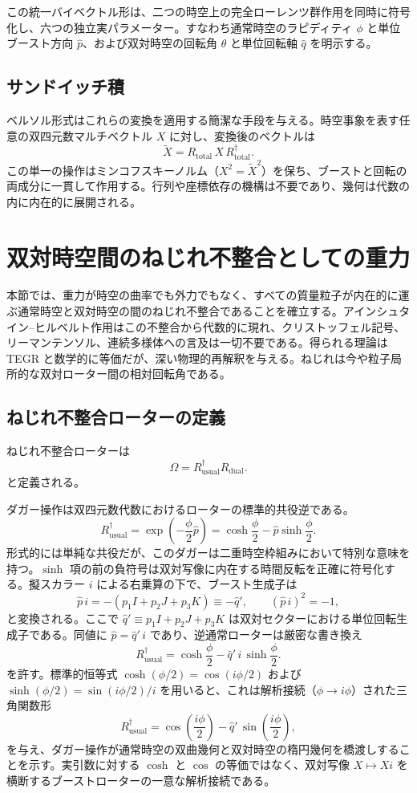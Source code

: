 \documentclass[a4paper]{article}
\begin{document}
この統一バイベクトル形は、二つの時空上の完全ローレンツ群作用を同時に符号化し、六つの独立実パラメーター。すなわち通常時空のラピディティ $\phi$ と単位ブースト方向 $\hat{p}$、および双対時空の回転角 $\theta$ と単位回転軸 $\hat{q}$ を明示する。

\subsection{サンドイッチ積}

ベルソル形式はこれらの変換を適用する簡潔な手段を与える。時空事象を表す任意の双四元数マルチベクトル $X$ に対し、変換後のベクトルは
\[
\tilde{X} = R_\text{total} \, X \, R_\text{total}^\dagger.
\]
この単一の操作はミンコフスキーノルム（$X^2 = \tilde{X}^2$）を保ち、ブーストと回転の両成分に一貫して作用する。行列や座標依存の機構は不要であり、幾何は代数の内に内在的に展開される。

\section{双対時空間のねじれ不整合としての重力}
\label{sec:gravity}

本節では、重力が時空の曲率でも外力でもなく、すべての質量粒子が内在的に運ぶ通常時空と双対時空の間のねじれ不整合であることを確立する。アインシュタイン--ヒルベルト作用はこの不整合から代数的に現れ、クリストッフェル記号、リーマンテンソル、連続多様体への言及は一切不要である。得られる理論は TEGR と数学的に等価だが、深い物理的再解釈を与える。ねじれは今や粒子局所的な双対ローター間の相対回転角である。

\subsection{ねじれ不整合ローターの定義}

ねじれ不整合ローターは
\[
\Omega = R_\text{usual}^\dagger R_\text{dual}.
\]
と定義される。

ダガー操作は双四元数代数におけるローターの標準的共役逆である。
\[
R_\text{usual}^\dagger = \exp\!\left( -\frac{\phi}{2} \hat{p} \right)
= \cosh\frac{\phi}{2} - \hat{p} \sinh\frac{\phi}{2}.
\]
形式的には単純な共役だが、このダガーは二重時空枠組みにおいて特別な意味を持つ。$\sinh$ 項の前の負符号は双対写像に内在する時間反転を正確に符号化する。擬スカラー $i$ による右乗算の下で、ブースト生成子は
\[
\hat{p}\, i = - (p_1 I + p_2 J + p_3 K) \equiv -\hat{q}',
\qquad (\hat{p}\, i)^2 = -1,
\]
と変換される。ここで $\hat{q}' \equiv p_1 I + p_2 J + p_3 K$ は双対セクターにおける単位回転生成子である。同値に $\hat{p} = \hat{q}'\, i$ であり、逆通常ローターは厳密な書き換え
\[
R_\text{usual}^\dagger = \cosh\frac{\phi}{2} - \hat{q}'\, i\, \sinh\frac{\phi}{2}.
\]
を許す。標準的恒等式 $\cosh(\phi/2) = \cos(i\phi/2)$ および $\sinh(\phi/2) = \sin(i\phi/2)/i$ を用いると、これは解析接続（$\phi \to i\phi$）された三角関数形
\[
R_\text{usual}^\dagger = \cos\!\left(\frac{i\phi}{2}\right) - \hat{q}'\, \sin\!\left(\frac{i\phi}{2}\right),
\]
を与え、ダガー操作が通常時空の双曲幾何と双対時空の楕円幾何を橋渡しすることを示す。実引数に対する $\cosh$ と $\cos$ の等価ではなく、双対写像 $X \mapsto X i$ を横断するブーストローターの一意な解析接続である。
\end{document}
